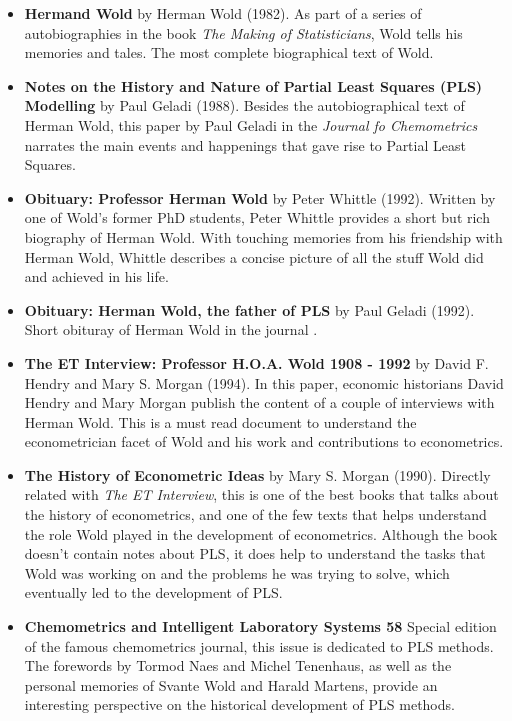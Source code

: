 \documentclass[12pt]{book}\usepackage{graphicx, color}
\begin{document}
\begin{itemize}
 \vspace{2mm}
 \item \textbf{\textsf{Hermand Wold}} by Herman Wold (1982). As part of a series of autobiographies in the book \textit{The Making of Statisticians}, Wold tells his memories and tales. The most complete biographical text of Wold.
 
 \vspace{2mm}
 \item \textbf{\textsf{Notes on the History and Nature of Partial Least Squares (PLS) Modelling}} by Paul Geladi (1988). Besides the autobiographical text of Herman Wold, this paper by Paul Geladi in the \textit{Journal fo Chemometrics} narrates the main events and happenings that gave rise to Partial Least Squares.
 
 \vspace{2mm}
 \item \textbf{\textsf{Obituary: Professor Herman Wold}} by Peter Whittle (1992). Written by one of Wold's former PhD students, Peter Whittle provides a short but rich biography of Herman Wold. With touching memories from his friendship with Herman Wold, Whittle describes a concise picture of all the stuff Wold did and achieved in his life.

 \vspace{2mm}
 \item \textbf{\textsf{Obituary: Herman Wold, the father of PLS}} by Paul Geladi (1992). Short obituray of Herman Wold in the journal .

 \vspace{2mm}
 \item \textbf{\textsf{The ET Interview: Professor H.O.A. Wold 1908 - 1992}} by David F. Hendry and Mary S. Morgan (1994). In this paper, economic historians David Hendry and Mary Morgan publish the content of a couple of interviews with Herman Wold. This is a must read document to understand the econometrician facet of Wold and his work and contributions to econometrics. 
 
 \vspace{2mm}
 \item \textbf{\textsf{The History of Econometric Ideas}} by Mary S. Morgan (1990). Directly related with \textit{The ET Interview}, this is one of the best books that talks about the history of econometrics, and one of the few texts that helps understand the role Wold played in the development of econometrics. Although the book doesn't contain notes about PLS, it does help to understand the tasks that Wold was working on and the problems he was trying to solve, which eventually led to the development of PLS.

 \vspace{2mm}
 \item \textbf{\textsf{Chemometrics and Intelligent Laboratory Systems 58}} Special edition of the famous chemometrics journal, this issue is dedicated to PLS methods. The forewords by Tormod Naes and Michel Tenenhaus, as well as the personal memories of Svante Wold and Harald Martens, provide an interesting perspective on the historical development of PLS methods.
 
\end{itemize}
\end{document}
